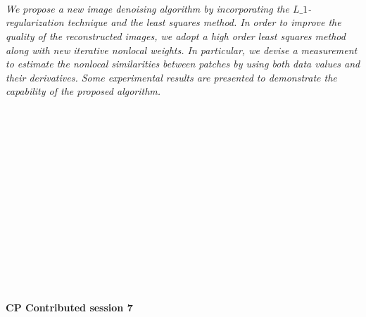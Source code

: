 \begin{multicols}{2}
        \\\\
\\
      \textit{We propose a new image denoising algorithm by incorporating the $L\_1$-regularization technique and the least squares method. In order to improve the quality of the reconstructed images, we adopt a high order least squares method along with new iterative nonlocal weights. In particular, we devise a measurement to estimate the nonlocal similarities between patches by using both data values and their derivatives. Some experimental results are presented to demonstrate the capability of the proposed algorithm.
}\\
\\ 
        \\
        \\\\
        \\
        \\\\
        \\
        \\\\
        \\
        \\\\
\\
\end{multicols}
  \noindent\textbf{CP Contributed session 7}\\
  \textit{} \\
    
